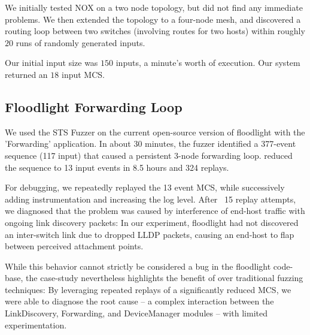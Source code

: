 We initially tested NOX on a two node topology, but did not find any immediate
problems. We then extended the topology to a four-node mesh, and discovered a
routing loop between two switches (involving routes for two hosts) within
roughly $20$ runs of randomly generated inputs.

Our initial input size was $150$ inputs, a minute's worth of execution.
Our system returned an $18$ input MCS.

\tbd{}

\subsection{Floodlight Forwarding Loop}

We used the STS Fuzzer on the current open-source version of floodlight with the
'Forwarding' application. In about 30 minutes, the fuzzer identified a 377-event
sequence (117 input) that caused a persistent 3-node forwarding loop. \simulator{
} reduced the sequence to 13 input events in 8.5 hours and 324 replays.

For debugging, we repeatedly replayed the 13 event MCS, while
successively adding instrumentation and increasing the log level. After 
~15 replay attempts, we diagnosed that the problem was caused by interference of
end-host traffic with ongoing link discovery packets: In our experiment, floodlight
had not discovered an inter-switch link due to dropped LLDP packets, causing an
end-host to flap between perceived attachment points.

While this behavior cannot strictly be considered a bug in the floodlight
code-base, the case-study nevertheless highlights the benefit of \simulator{}
over traditional fuzzing techniques: By leveraging repeated replays of a
significantly reduced MCS, we were able to diagnose the root cause -- a complex
interaction between the LinkDiscovery, Forwarding, and DeviceManager
modules -- with limited experimentation.
